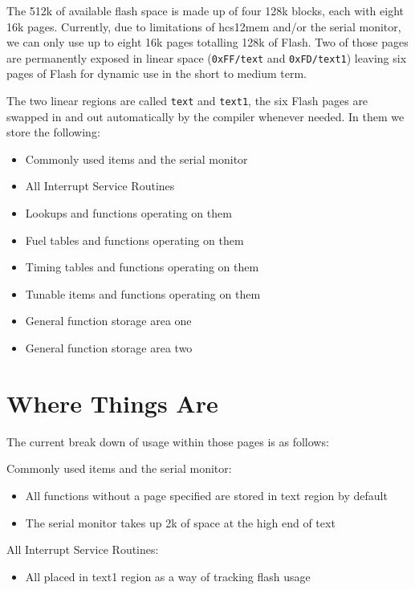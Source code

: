 \documentclass[12pt,a4wide,titlepage]{article}
\begin{document}
The 512k of available flash space is made up of four 128k blocks, each with
eight 16k pages. Currently, due to limitations of hcs12mem and/or the serial
monitor, we can only use up to eight 16k pages totalling 128k of Flash. Two of
those pages are permanently exposed in linear space (\texttt{0xFF/text} and
\texttt{0xFD/text1}) leaving six pages of Flash for dynamic use in the short to
medium term.

The two linear regions are called \texttt{text} and \texttt{text1}, the six Flash pages are
swapped in and out automatically by the compiler whenever needed. In them we
store the following:

\begin{itemize}
\item Commonly used items and the serial monitor
\item All Interrupt Service Routines
\item Lookups and functions operating on them
\item Fuel tables and functions operating on them
\item Timing tables and functions operating on them
\item Tunable items and functions operating on them
\item General function storage area one
\item General function storage area two
\end{itemize}




\section{Where Things Are}

The current break down of usage within those pages is as follows:

Commonly used items and the serial monitor:

\begin{itemize}
\item All functions without a page specified are stored in text region by default
\item The serial monitor takes up 2k of space at the high end of text
\end{itemize}

All Interrupt Service Routines:

\begin{itemize}
\item All placed in text1 region as a way of tracking flash usage
\end{itemize}
\end{document}
